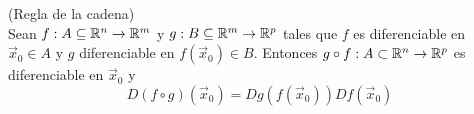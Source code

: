 
\begin{teorema}{\rm (Regla de la cadena)} 
\\Sean $f:A\subseteq\mathbb{R}^n\to\mathbb{R}^m$ y $g:B\subseteq\mathbb{R}^m\to\mathbb{R}^p$ tales que $f$ es diferenciable en $\vec{x}_0\in A$ y $g$ diferenciable en $f(\vec{x}_0)\in B$. Entonces $g\circ f:A\subset\mathbb{R}^n\to\mathbb{R}^p$ es diferenciable en $\vec{x}_0$ y
$$D(f\circ g)(\vec{x}_0)=Dg(f(\vec{x}_0))Df(\vec{x}_0)$$
\end{teorema}

